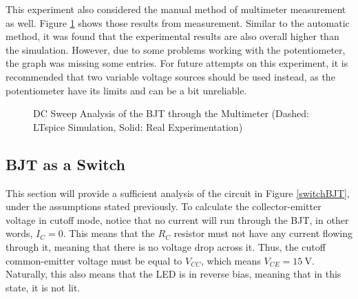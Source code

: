 \documentclass[11pt]{report}
\begin{document}
This experiment also considered the manual method of multimeter measurement as well. Figure \ref{sect1-2} shows those results from measurement. Similar to the automatic method, it was found that the experimental results are also overall higher than the simulation. However, due to some problems working with the potentiometer, the graph was missing some entries. For future attempts on this experiment, it is recommended that two variable voltage sources should be used instead, as the potentiometer have its limits and can be a bit unreliable.
\begin{figure}[h]
	\centering
	\caption{DC Sweep Analysis of the BJT through the Multimeter (Dashed: LTspice Simulation, Solid: Real Experimentation)}
	\label{sect1-2}
\end{figure}

\subsection{BJT as a Switch}
This section will provide a sufficient analysis of the circuit in Figure \ref{switchBJT}, under the assumptions stated previously. To calculate the collector-emitter voltage in cutoff mode, notice that no current will run through the BJT, in other words, $I_C = 0$. This means that the $R_C$ resistor must not have any current flowing through it, meaning that there is no voltage drop across it. Thus, the cutoff common-emitter voltage must be equal to $V_{CC}$, which means $V_{CE} = \SI{15}{\volt}$. Naturally, this also means that the LED is in reverse bias, meaning that in this state, it is not lit.
\end{document}
